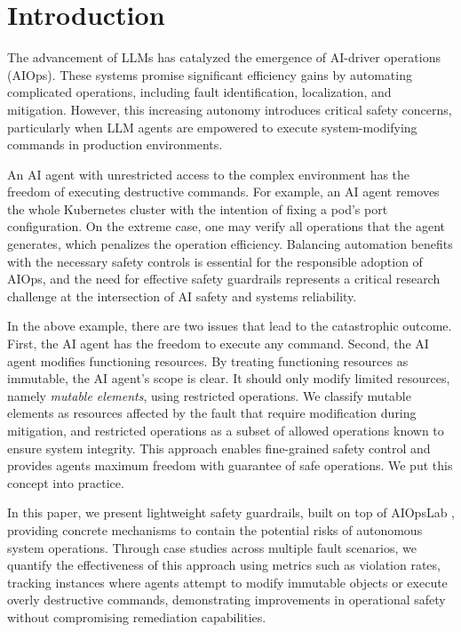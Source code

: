 \section{Introduction}
\label{sec:introduction}

The advancement of LLMs has catalyzed the emergence of AI-driver operations (AIOps). These systems promise significant efficiency gains by automating complicated operations, including fault identification, localization, and mitigation. However, this increasing autonomy introduces critical safety concerns, particularly when LLM agents are empowered to execute system-modifying commands in production environments.

An AI agent with unrestricted access to the complex environment has the freedom of executing destructive commands. For example, an AI agent removes the whole Kubernetes cluster with the intention of fixing a pod's port configuration. On the extreme case, one may verify all operations that the agent generates, which penalizes the operation efficiency. Balancing automation benefits with the necessary safety controls is essential for the responsible adoption of AIOps, and the need for effective safety guardrails represents a critical research challenge at the intersection of AI safety and systems reliability.

In the above example, there are two issues that lead to the catastrophic outcome. First, the AI agent has the freedom to execute any command. Second, the AI agent modifies functioning resources. By treating functioning resources as immutable, the AI agent's scope is clear. It should only modify limited resources, namely \textit{mutable elements}, using restricted operations. We classify mutable elements as resources affected by the fault that require modification during mitigation, and restricted operations as a subset of allowed operations known to ensure system integrity. This approach enables fine-grained safety control and provides agents maximum freedom with guarantee of safe operations. We put this concept into practice.

In this paper, we present lightweight safety guardrails, built on top of AIOpsLab \cite{shetty2024aiagents}, providing concrete mechanisms to contain the potential risks of autonomous system operations. Through case studies across multiple fault scenarios, we quantify the effectiveness of this approach using metrics such as violation rates, tracking instances where agents attempt to modify immutable objects or execute overly destructive commands, demonstrating improvements in operational safety without compromising remediation capabilities.
